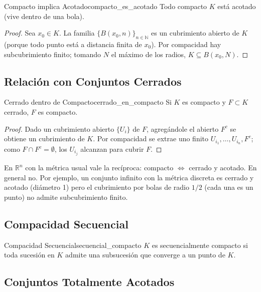 \documentclass[11pt, a4paper]{article}
\begin{document}
\begin{proposicion}{Compacto implica Acotado}{compacto_es_acotado}
Todo compacto $K$ está acotado (vive dentro de una bola).
\end{proposicion}

\begin{proof}
Sea $x_0 \in K$. La familia $\{B(x_0, n)\}_{n \in \mathbb{N}}$ es un cubrimiento abierto de $K$
(porque todo punto está a distancia finita de $x_0$). Por compacidad hay subcubrimiento finito;
tomando $N$ el máximo de los radios, $K \subseteq B(x_0, N)$.
\end{proof}

\subsection{Relación con Conjuntos Cerrados}

\begin{proposicion}{Cerrado dentro de Compacto}{cerrado_en_compacto}
Si $K$ es compacto y $F \subset K$ cerrado, $F$ es compacto.
\end{proposicion}

\begin{proof}
Dado un cubrimiento abierto $\{U_i\}$ de $F$, agregándole el abierto $F^c$ se obtiene un
cubrimiento de $K$. Por compacidad se extrae uno finito $U_{i_1}, \dots, U_{i_n}, F^c$; como
$F \cap F^c = \emptyset$, los $U_{i_j}$ alcanzan para cubrir $F$.
\end{proof}

\obs En $\mathbb{R}^n$ con la métrica usual vale la recíproca: compacto $\iff$ cerrado y
acotado. En general no. Por ejemplo, un conjunto infinito con la métrica discreta es cerrado y
acotado (diámetro 1) pero el cubrimiento por bolas de radio $1/2$ (cada una es un punto) no admite
subcubrimiento finito.


\subsection{Compacidad Secuencial}

\begin{definicion}{Compacidad Secuencial}{secuencial_compacto}
$K$ es secuencialmente compacto si toda sucesión en $K$ admite una subsucesión que converge a un
punto de $K$.
\end{definicion}

\subsection{Conjuntos Totalmente Acotados}
\end{document}
